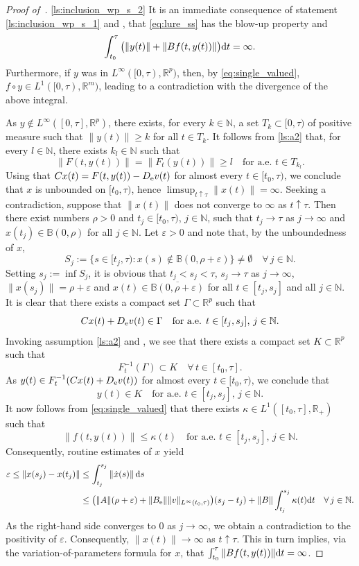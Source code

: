 \documentclass[a4paper,11pt]{article}
\newcommand{\B}{\mathbb B}
\newcommand{\R}{\mathbb R}
\newcommand{\mN}{\mathbb N}
\newcommand{\N}{\mathbb N}
\newcommand{\rd}{{\rm d}}
\numberwithin{equation}{section}
\numberwithin{figure}{section}
\numberwithin{table}{section}
\begin{document}
\begin{proof}[Proof of~]
\ref{ls:inclusion_wp_s_2} It is an immediate consequence of statement \ref{ls:inclusion_wp_s_1} and , that \eqref{eq:lure_ss} has the blow-up property and
\[
\int_{t_0}^\tau\big(\|y(t)\|+\|Bf(t,y(t))\|\big){\rm d}t=\infty.
\]
Furthermore, if $y$ was in $L^\infty([0,\tau),\R^p)$, then, by \eqref{eq:single_valued},
$f\circ y\in L^1([0,\tau),\R^m)$, leading to a contradiction with the divergence of the
above integral.

As $y\not\in L^\infty([0,\tau],\R^p)$, there exists, for every $k\in\N$,
a set $T_k\subset [0,\tau)$ of positive measure such that $\|y(t)\|\geq k$ for all $t\in T_k$. It follows from \ref{ls:a2} that,  for every $l\in\N$, there exists $k_l\in\N$ such that
\[
\|F(t,y(t))\|=\|F_t(y(t))\|\geq l\quad\mbox{for a.e. $t\in T_{k_l}$}.
\]
Using that $Cx(t)=F(t,y(t))-D_{\rm e}v(t)$ for almost every $t\in[t_0,\tau)$,
we conclude that $x$ is unbounded on $[t_0,\tau)$, hence $\limsup_{t\uparrow\tau}\|x(t)\|=\infty$.
Seeking a contradiction, suppose that $\|x(t)\|$ does not converge to $\infty$ as $t\uparrow\tau$.
Then there exist numbers $\rho>0$ and $t_j\in[t_0,\tau)$, $j\in\N$, such that $t_j\to\tau$ as $j\to\infty$ and $x(t_j)\in\B(0,\rho)$ for all $j\in\N$. Let $\varepsilon>0$ and note that, by the
unboundedness of $x$,
\[
S_j:=\{s\in[t_j,\tau):x(s)\not\in\B(0,\rho+\varepsilon)\}\not=\emptyset\quad\forall\,j\in\N.
\]
Setting $s_j:=\inf S_j$, it is obvious that $t_j<s_j<\tau$, $s_j\to\tau$ as $j\to\infty$,
$\|x(s_j)\|=\rho+\varepsilon$ and $x(t)\in\overline{\B(0,\rho+\varepsilon)}$ for all $t\in[t_j,s_j]$ and all $j\in\N$. It is clear that there exists a compact set $\Gamma\subset\R^p$ such that
\[
Cx(t)+D_{\rm e}v(t)\in\Gamma\quad\mbox{for a.e. $t\in[t_j,s_j]$, $j\in\N$}.
\]
Invoking assumption \ref{ls:a2} and , we see that there exists
a compact set $K\subset\R^p$ such that
\[
F_t^{-1}(\Gamma)\subset K\quad\forall\,t\in[t_0,\tau].
\]
As $y(t)\in F_t^{-1}(Cx(t)+D_{\rm e}v(t))$ for almost every $t\in[t_0,\tau)$, we conclude that
\[
y(t)\in K\quad\mbox{for a.e. $t\in[t_j,s_j]$, $j\in\N$}.
\]
It now follows from \eqref{eq:single_valued} that there exists $\kappa\in L^1([t_0,\tau],\R_+)$ such that
\[
\|f(t,y(t))\|\leq\kappa(t)\quad\mbox{for a.e. $t\in[t_j,s_j]$, $j\in\N$}.
\]
Consequently, routine estimates of $x$ yield
\begin{align*}
\varepsilon\leq\|x(s_j)-x(t_j)\|&\leq \int_{t_j}^{s_j} \| \dot x(s) \| \, \rd s \\
& \leq \big(\|A\|(\rho+\varepsilon)+\|B_{\rm e}\|\|v\|_{L^\infty(t_0,\tau)}\big)
(s_j-t_j)+\|B\|\int_{t_j}^{s_j}\kappa(t){\rm d}t\quad\forall\,j\in\N.
\end{align*}
%
As the right-hand side converges to $0$ as $j\to\infty$, we obtain a contradiction to the positivity of
$\varepsilon$. Consequently, $\|x(t)\|\to\infty$ as $t\uparrow\tau$. This in turn implies, via the
variation-of-parameters formula for $x$, that $\int_{t_0}^\tau\|Bf(t,y(t))\|{\rm d}t=\infty$.
\end{proof}
\end{document}
